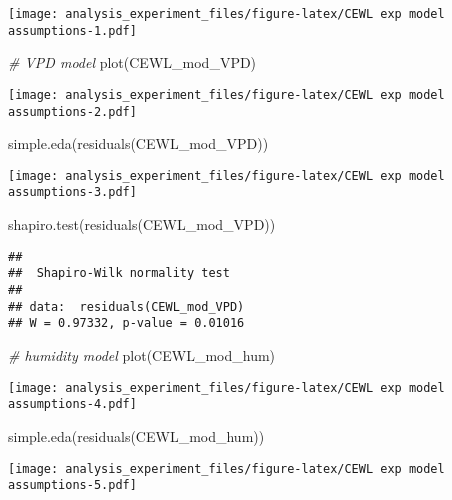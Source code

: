 \documentclass[
]{article}
\newenvironment{Shaded}{\begin{snugshade}}{\end{snugshade}}
\newcommand{\CommentTok}[1]{\textcolor[rgb]{0.56,0.35,0.01}{\textit{#1}}}
\newcommand{\FunctionTok}[1]{\textcolor[rgb]{0.00,0.00,0.00}{#1}}
\newcommand{\NormalTok}[1]{#1}
\begin{document}
\texttt{[image: analysis\_experiment\_files/figure-latex/CEWL exp model assumptions-1.pdf]}

\begin{Shaded}
\begin{Highlighting}[]
\CommentTok{\# VPD model}
\FunctionTok{plot}\NormalTok{(CEWL\_mod\_VPD)}
\end{Highlighting}
\end{Shaded}

\texttt{[image: analysis\_experiment\_files/figure-latex/CEWL exp model assumptions-2.pdf]}

\begin{Shaded}
\begin{Highlighting}[]
\FunctionTok{simple.eda}\NormalTok{(}\FunctionTok{residuals}\NormalTok{(CEWL\_mod\_VPD))}
\end{Highlighting}
\end{Shaded}

\texttt{[image: analysis\_experiment\_files/figure-latex/CEWL exp model assumptions-3.pdf]}

\begin{Shaded}
\begin{Highlighting}[]
\FunctionTok{shapiro.test}\NormalTok{(}\FunctionTok{residuals}\NormalTok{(CEWL\_mod\_VPD))}
\end{Highlighting}
\end{Shaded}

\begin{verbatim}
## 
##  Shapiro-Wilk normality test
## 
## data:  residuals(CEWL_mod_VPD)
## W = 0.97332, p-value = 0.01016
\end{verbatim}

\begin{Shaded}
\begin{Highlighting}[]
\CommentTok{\# humidity model}
\FunctionTok{plot}\NormalTok{(CEWL\_mod\_hum)}
\end{Highlighting}
\end{Shaded}

\texttt{[image: analysis\_experiment\_files/figure-latex/CEWL exp model assumptions-4.pdf]}

\begin{Shaded}
\begin{Highlighting}[]
\FunctionTok{simple.eda}\NormalTok{(}\FunctionTok{residuals}\NormalTok{(CEWL\_mod\_hum))}
\end{Highlighting}
\end{Shaded}

\texttt{[image: analysis\_experiment\_files/figure-latex/CEWL exp model assumptions-5.pdf]}
\end{document}
